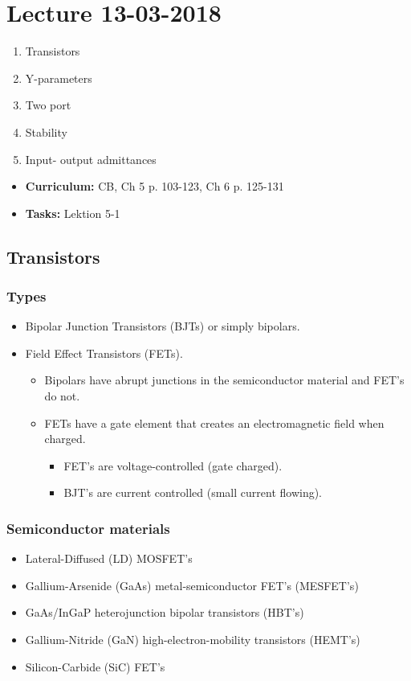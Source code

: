 \section{Lecture 13-03-2018}

\begin{enumerate}
	\item Transistors
	\item Y-parameters
	\item Two port
	\item Stability
	\item Input- output admittances
\end{enumerate}

\begin{mdframed}[style=exampledefault]
	\begin{itemize}
		\item \textbf{Curriculum:} CB, Ch 5 p. 103-123, Ch 6 p. 125-131
		\item \textbf{Tasks:} Lektion 5-1
	\end{itemize}
\end{mdframed}

\subsection{Transistors}
\subsubsection{Types}
\begin{itemize}
	\item Bipolar Junction Transistors (BJTs) or simply bipolars.
	\item Field Effect Transistors (FETs). 
	\begin{itemize}
		\item Bipolars have abrupt junctions in the semiconductor material and
		FET's do not.
		\item FETs have a gate element that creates an electromagnetic field when charged.
		\begin{itemize}
			\item FET's are voltage-controlled (gate charged).
			\item BJT's are current controlled (small current flowing).
		\end{itemize}
	\end{itemize}
\end{itemize}

\subsubsection{Semiconductor materials}
\begin{itemize}
	\item Lateral-Diffused (LD) MOSFET's
	\item Gallium-Arsenide (GaAs) metal-semiconductor FET's (MESFET's)
	\item GaAs/InGaP heterojunction	bipolar transistors (HBT's)
	\item Gallium-Nitride (GaN)	high-electron-mobility transistors (HEMT's)
	\item Silicon-Carbide (SiC) FET's
\end{itemize}

